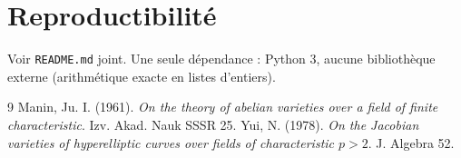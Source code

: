 \documentclass[12pt,a4paper]{article}
\theoremstyle{definition}
\begin{document}
\section{Reproductibilité}

Voir \texttt{README.md} joint. Une seule dépendance : Python 3, aucune bibliothèque externe (arithmétique exacte en listes d'entiers).

\begin{thebibliography}{9}
 Manin, Ju. I. (1961). \emph{On the theory of abelian varieties over a field of finite characteristic}. Izv. Akad. Nauk SSSR 25.
 Yui, N. (1978). \emph{On the Jacobian varieties of hyperelliptic curves over fields of characteristic $p>2$}. J. Algebra 52.
\end{thebibliography}
\end{document}
